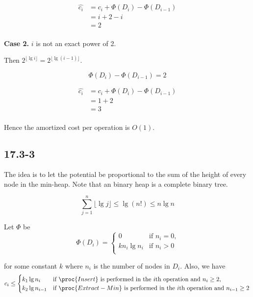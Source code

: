 \begin{equation*}
\begin{split}
    \hat{c_i} & = c_i + \Phi(D_i) - \Phi(D_{i - 1}) \\
    & = i + 2 - i \\
    & = 2 \\
\end{split}
\end{equation*}

\textbf{Case 2.}
$i$ is not an exact power of 2.

Then $2^{\lfloor \lg i \rfloor} = 2^{\lfloor \lg (i - 1) \rfloor}$.

\begin{equation*}
    \Phi(D_i) - \Phi(D_{i - 1}) = 2
\end{equation*}

\begin{equation*}
\begin{split}
    \hat{c_i} & = c_i + \Phi(D_i) - \Phi(D_{i - 1}) \\
    & = 1 + 2 \\
    & = 3 \\
\end{split}
\end{equation*}

Hence the amortized cost per operation is $O(1)$.

\subsection*{17.3-3}

The idea is to let the potential be proportional to 
the sum of the height of every node in the min-heap.
Note that an binary heap is a complete binary tree.

\begin{equation*}
    \sum\limits_{j=1}^n \lfloor \lg j \rfloor
    \leq \lg (n!) \leq n \lg n
\end{equation*}

Let $\Phi$ be 
\begin{equation*}
    \Phi(D_i) = 
    \begin{cases}
        0 & \text{if $n_i = 0$,} \\
        k n_i \lg n_i & \text{if $n_i > 0$} \\
    \end{cases}
\end{equation*}

for some constant $k$
where $n_i$ is the number of nodes in $D_i$.
Also, we have
\begin{equation*}
    c_i \leq 
    \begin{cases}
        k_1 \lg n_i & \text{if $\proc{Insert}$ is performed in the $i$th operation 
            and $n_i \geq 2$,} \\
        k_2 \lg n_{i-1} & \text{if $\proc{Extract-Min}$ is performed in the $i$th operation 
            and $n_{i-1} \geq 2$} \\
    \end{cases}
\end{equation*}

